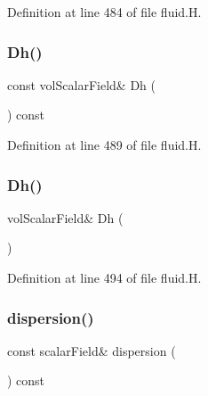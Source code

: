Definition at line 484 of file fluid.\+H.

\mbox{\label{classFoam_1_1fluid_ac7cf53b510afce511c82e2097ea86d02}} 
\subsubsection{\texorpdfstring{Dh()}{Dh()}\hspace{0.1cm}{\footnotesize\ttfamily [1/2]}}
{\footnotesize\ttfamily const vol\+Scalar\+Field\& Dh (\begin{DoxyParamCaption}{ }\end{DoxyParamCaption}) const\hspace{0.3cm}{\ttfamily [inline]}}



Definition at line 489 of file fluid.\+H.

\mbox{\label{classFoam_1_1fluid_a21ea201ec743a9aef76e74b4e2e2f98a}} 
\subsubsection{\texorpdfstring{Dh()}{Dh()}\hspace{0.1cm}{\footnotesize\ttfamily [2/2]}}
{\footnotesize\ttfamily vol\+Scalar\+Field\& Dh (\begin{DoxyParamCaption}{ }\end{DoxyParamCaption})\hspace{0.3cm}{\ttfamily [inline]}}



Definition at line 494 of file fluid.\+H.

\mbox{\label{classFoam_1_1fluid_acbdfda4d5961a439295a329bf8ad4854}} 
\subsubsection{\texorpdfstring{dispersion()}{dispersion()}\hspace{0.1cm}{\footnotesize\ttfamily [1/2]}}
{\footnotesize\ttfamily const scalar\+Field\& dispersion (\begin{DoxyParamCaption}{ }\end{DoxyParamCaption}) const\hspace{0.3cm}{\ttfamily [inline]}}




